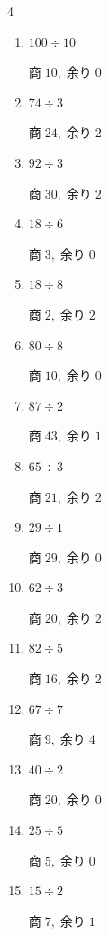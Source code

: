 \begin{multicols}{4}
\begin{enumerate}
        $商\; 9,\; 余り\; 9$

  \item $100 \div 10$

        $商\; 10,\; 余り\; 0$

  \item $74 \div 3$

        $商\; 24,\; 余り\; 2$

  \item $92 \div 3$

        $商\; 30,\; 余り\; 2$

  \item $18 \div 6$

        $商\; 3,\; 余り\; 0$

  \item $18 \div 8$

        $商\; 2,\; 余り\; 2$

  \item $80 \div 8$

        $商\; 10,\; 余り\; 0$

  \item $87 \div 2$

        $商\; 43,\; 余り\; 1$

  \item $65 \div 3$

        $商\; 21,\; 余り\; 2$

  \item $29 \div 1$

        $商\; 29,\; 余り\; 0$

  \item $62 \div 3$

        $商\; 20,\; 余り\; 2$

  \item $82 \div 5$

        $商\; 16,\; 余り\; 2$

  \item $67 \div 7$

        $商\; 9,\; 余り\; 4$

  \item $40 \div 2$

        $商\; 20,\; 余り\; 0$

  \item $25 \div 5$

        $商\; 5,\; 余り\; 0$

  \item $15 \div 2$

        $商\; 7,\; 余り\; 1$

\end{enumerate}
\end{multicols}
